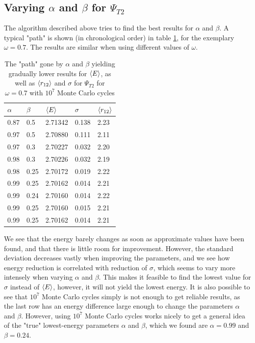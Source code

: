\documentclass[10pt,a4paper]{article}
\begin{document}
\subsection{Varying $\alpha$ and $\beta$ for $\Psi_{T2}$}
The algorithm described above tries to find the best results for $\alpha$ and $\beta$. A typical "path" is shown (in chronological order) in table \ref{table2}, for the exemplary $\omega=0.7$. The results are similar when using different values of $\omega$.
\begin{table}[H]
\centering
\caption[Varying $\alpha$ and $\beta$]{The "path" gone by  $\alpha$ and $\beta$ yielding gradually lower results for  $\braket{E}$, as well as  $\braket{r_{12}}$ and $\sigma$ for $\Psi_{T2}$ for $\omega=0.7$ with $10^7$ Monte Carlo cycles}
\begin{tabular}{|l|l|l|l|l|}
\hline
$\alpha$ & $\beta$ & $\braket{E}$ & $\sigma$ & $\braket{r_{12}}$ \\ \hline
0.87     & 0.5     & 2.71342        & 0.138    & 2.23              \\ \hline
0.97     & 0.5     & 2.70880       & 0.111    & 2.11              \\ \hline
0.97     & 0.3     & 2.70227        & 0.032    & 2.20              \\ \hline
0.98     & 0.3     & 2.70226        & 0.032    & 2.19              \\ \hline
0.98     & 0.25    & 2.70172        & 0.019    & 2.22              \\ \hline
0.99     & 0.25    & 2.70162        & 0.014    & 2.21              \\ \hline
0.99     & 0.24    & 2.70160        & 0.014    & 2.22              \\ \hline
0.99     & 0.25    & 2.70160        & 0.015    & 2.21              \\ \hline
0.99     & 0.25    & 2.70162        & 0.014    & 2.21              \\ \hline
\end{tabular}\label{table2}
\end{table}
We see that the energy barely changes as soon as approximate values have been found, and that there is little room for improvement. However, the standard deviation decreases vastly when improving the parameters, and we see how energy reduction is correlated with reduction of $\sigma$, which seems to vary more intensely when varying $\alpha$ and $\beta$. This makes it feasible to find the lowest value for $\sigma$ instead of $\braket{E}$, however, it will not yield the lowest energy. It is also possible to see that $10^7$ Monte Carlo cycles simply is not enough to get reliable results, as the last row has an energy difference large enough to change the parameters $\alpha$ and $\beta$. However, using $10^7$ Monte Carlo cycles works nicely to get a general idea of the "true" lowest-energy parameters $\alpha$ and $\beta$, which we found are $\alpha=0.99$ and $\beta=0.24$.
\end{document}
